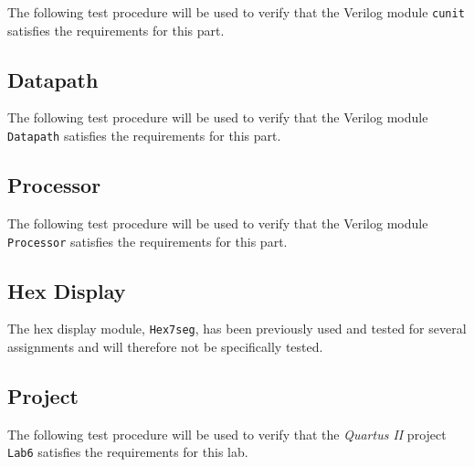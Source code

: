 The following test procedure will be used to verify that the Verilog module \verb|cunit| satisfies the requirements for this part.



\subsection{Datapath} %
\label{sub:datapath}

The following test procedure will be used to verify that the Verilog module \verb|Datapath| satisfies the requirements for this part.



\subsection{Processor} %
\label{sub:processor}

The following test procedure will be used to verify that the Verilog module \verb|Processor| satisfies the requirements for this part.



\subsection{Hex Display} %
\label{sub:hex_display}

The hex display module, \verb|Hex7seg|, has been previously used and tested for several assignments and will therefore not be specifically tested.

\subsection{Project} %
\label{sub:project}

The following test procedure will be used to verify that the \emph{Quartus II} project \verb|Lab6| satisfies the requirements for this lab.

